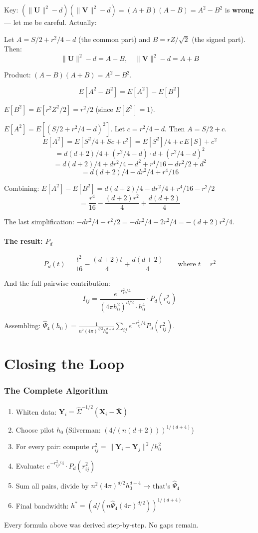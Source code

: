 \documentclass[12pt]{article}
\newcommand{\mathnote}[1]{\begin{tcolorbox}[colback=yellow!5,colframe=yellow!60!black,breakable]#1\end{tcolorbox}}
\begin{document}
Key: $(\|\mathbf{U}\|^2 - d)(\|\mathbf{V}\|^2 - d) = (A+B)(A-B) = A^2 - B^2$ is \textbf{wrong} --- let me be careful. Actually:

Let $A = S/2 + r^2/4 - d$ (the common part) and $B = rZ/\sqrt{2}$ (the signed part). Then:
$$\|\mathbf{U}\|^2 - d = A - B, \quad \|\mathbf{V}\|^2 - d = A + B$$

Product: $(A-B)(A+B) = A^2 - B^2$.

$$E[A^2 - B^2] = E[A^2] - E[B^2]$$

$E[B^2] = E[r^2 Z^2/2] = r^2/2$ (since $E[Z^2] = 1$).

$E[A^2] = E[(S/2 + r^2/4 - d)^2]$. Let $c = r^2/4 - d$. Then $A = S/2 + c$.
$$E[A^2] = E[S^2/4 + Sc + c^2] = E[S^2]/4 + c\,E[S] + c^2$$
$$= d(d+2)/4 + (r^2/4-d)\cdot d + (r^2/4-d)^2$$
$$= d(d+2)/4 + dr^2/4 - d^2 + r^4/16 - dr^2/2 + d^2$$
$$= d(d+2)/4 - dr^2/4 + r^4/16$$

Combining: $E[A^2] - E[B^2] = d(d+2)/4 - dr^2/4 + r^4/16 - r^2/2$
$$= \frac{r^4}{16} - \frac{(d+2)r^2}{4} + \frac{d(d+2)}{4}$$

\mathnote{The last simplification: $-dr^2/4 - r^2/2 = -dr^2/4 - 2r^2/4 = -(d+2)r^2/4$.}

\subsection{The result: $P_d$}

$$\boxed{P_d(t) = \frac{t^2}{16} - \frac{(d+2)t}{4} + \frac{d(d+2)}{4}} \qquad\text{where } t = r^2$$

And the full pairwise contribution:
$$I_{ij} = \frac{e^{-r_{ij}^2/4}}{(4\pi h_0^2)^{d/2}\cdot h_0^4}\cdot P_d(r_{ij}^2)$$

Assembling: $\hat\Psi_4(h_0) = \frac{1}{n^2(4\pi)^{d/2}h_0^{d+4}}\sum_{ij}e^{-r_{ij}^2/4}P_d(r_{ij}^2)$.

\part{Closing the Loop}

\section{The Complete Algorithm}

\begin{enumerate}
\item Whiten data: $\mathbf{Y}_i = \hat\Sigma^{-1/2}(\mathbf{X}_i-\bar{\mathbf{X}})$
\item Choose pilot $h_0$ (Silverman: $(4/(n(d+2)))^{1/(d+4)}$)
\item For every pair: compute $r_{ij}^2 = \|\mathbf{Y}_i-\mathbf{Y}_j\|^2/h_0^2$
\item Evaluate: $e^{-r_{ij}^2/4}\cdot P_d(r_{ij}^2)$
\item Sum all pairs, divide by $n^2(4\pi)^{d/2}h_0^{d+4}$ → that's $\hat\Psi_4$
\item Final bandwidth: $h^* = (d/(n\hat\Psi_4(4\pi)^{d/2}))^{1/(d+4)}$
\end{enumerate}

Every formula above was derived step-by-step. No gaps remain.
\end{document}

